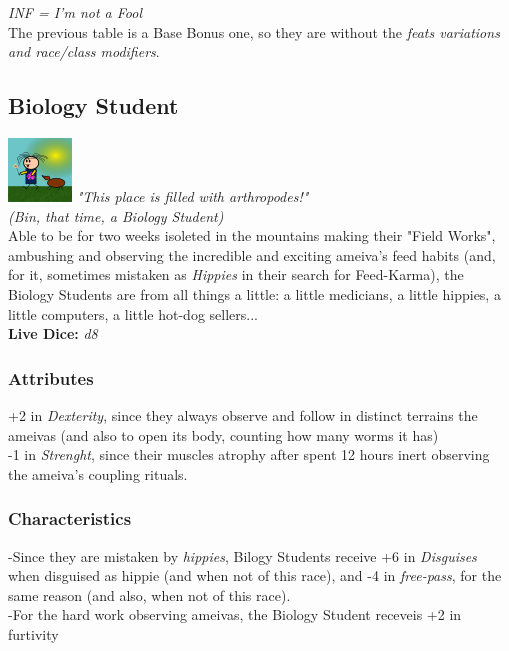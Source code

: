 \documentclass[ letterpaper,12pt]{article}
\begin{document}
{\it *INF = I'm not a Fool}\\

The previous table is a Base Bonus one, so they are without the {\it feats variations and race/class modifiers}.\\

\subsection{Biology Student}
\includegraphics{../data/classes/Img/biologia.png}
{\it "This place is filled with arthropodes!"\\(Bin, that time, a Biology Student)}\\

Able to be for two weeks isoleted in the mountains making their "Field Works",
ambushing and observing the incredible and exciting ameiva's feed habits (and,
for it, sometimes mistaken as {\it Hippies} in their search for Feed-Karma),
the Biology Students are from all things a little: a little medicians, a little
hippies, a little computers, a little hot-dog sellers...\\

{\bf Live Dice:} {\it d8}

\subsubsection{Attributes}
+2 in {\it Dexterity}, since they always observe and follow in distinct terrains the ameivas (and also to open its body, counting how many worms it has)\\
-1 in {\it Strenght}, since their muscles atrophy after spent 12 hours inert observing the ameiva's coupling rituals.\\

\subsubsection{Characteristics}
-Since they are mistaken by {\it hippies}, Bilogy Students receive +6 in {\it Disguises} when disguised as hippie (and when not of this race), and -4 in {\it free-pass}, for the same reason (and also, when not of this race).\\
-For the hard work observing ameivas, the Biology Student receveis +2 in {furtivity}\\
\end{document}
